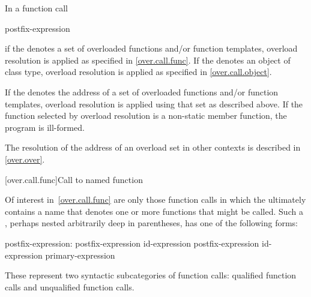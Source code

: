 \pnum
In a function call

\begin{ncsimplebnf}
postfix-expression \terminal{(}  \terminal{)}
\end{ncsimplebnf}

if the  denotes a set of overloaded functions and/or
function templates, overload resolution is applied as specified in \ref{over.call.func}.
If the  denotes an object of class type, overload
resolution is applied as specified in \ref{over.call.object}.

\pnum
If the  denotes the address of a set of overloaded
functions and/or function templates, overload resolution is applied using that set as
described above. If the function selected by overload resolution is a non-static member
function, the program is ill-formed. \begin{note} The resolution of the address of an
overload set in other contexts is described in \ref{over.over}. \end{note}

[over.call.func]{Call to named function}

\pnum
Of interest in~\ref{over.call.func} are only those function calls in
which the
ultimately contains a name that
denotes one or more functions that might be called.
Such a
,
perhaps nested arbitrarily deep in
parentheses, has one of the following forms:

\begin{ncbnf}
postfix-expression:\br
    postfix-expression  id-expression\br
    postfix-expression \terminal{->} id-expression\br
    primary-expression
\end{ncbnf}

These represent two syntactic subcategories of function calls:
qualified function calls and unqualified function calls.

